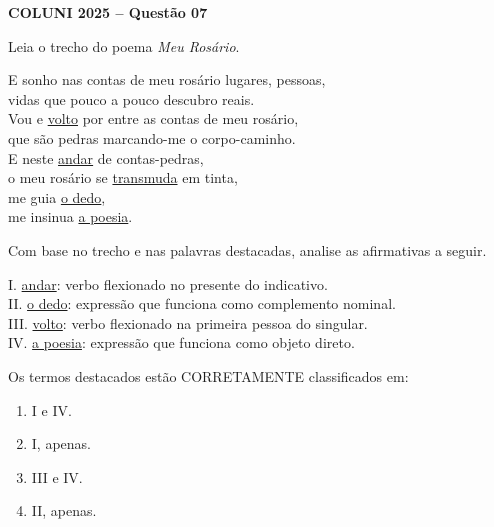 \textbf{COLUNI 2025 -- Questão 07}\par\medskip Leia o trecho do poema \textit{Meu Rosário}.

E sonho nas contas de meu rosário lugares, pessoas,\\
vidas que pouco a pouco descubro reais.\\
Vou e \underline{volto} por entre as contas de meu rosário,\\
que são pedras marcando-me o corpo-caminho.\\
E neste \underline{andar} de contas-pedras,\\
o meu rosário se \underline{transmuda} em tinta,\\
me guia \underline{o dedo},\\
me insinua \underline{a poesia}.

Com base no trecho e nas palavras destacadas, analise as afirmativas a seguir.

I. \underline{andar}: verbo flexionado no presente do indicativo.\\
II. \underline{o dedo}: expressão que funciona como complemento nominal.\\
III. \underline{volto}: verbo flexionado na primeira pessoa do singular.\\
IV. \underline{a poesia}: expressão que funciona como objeto direto.

Os termos destacados estão CORRETAMENTE classificados em:
\begin{enumerate}
\item I e IV.
\item I, apenas.
\item III e IV.
\item II, apenas.
\end{enumerate}
